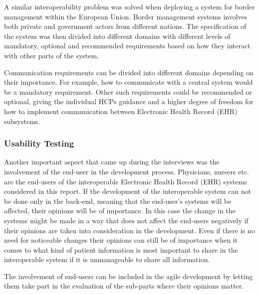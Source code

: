 \documentclass[14pt]{article}
\begin{document}
A similar interoperability problem was solved when deploying a system for border management within the European Union. Border management systems involves both private and government actors from different nations. The specification of the system was then divided into different domains with different levels of mandatory, optional and recommended requirements based on how they interact with other parts of the system. \cite{BorderMgmt}

Communication requirements can be divided into different domains depending on their importance. For example, how to communicate with a central system would be a mandatory requirement. Other such requirements could be recommended or optional, giving the individual HCPs guidance and a higher degree of freedom for how to implement communication between Electronic Health Record (EHR) subsystems. 

\subsubsection{Usability Testing}
\label{sec:resultsUsabilityTesting}
Another important aspect that came up during the interviews was the involvement of the end-user in the development process. Physicians, nursers etc. are the end-users of the interoperable Electronic Health Record (EHR) systems considered in this report. If the development of the interoperable system can not be done only in the back-end, meaning that the end-user's systems will be affected, their opinions will be of importance. In this case the change in the systems might be made in a way that does not affect the end-users negatively if their opinions are taken into consideration in the development. Even if there is no need for noticeable changes their opinions can still be of importance when it comes to what kind of patient information is most important to share in the interoperable system if it is unmanageable to share all information. 

The involvement of end-users can be included in the agile development by letting them take part in the evaluation of the sub-parts where their opinions matter. 
\end{document}
